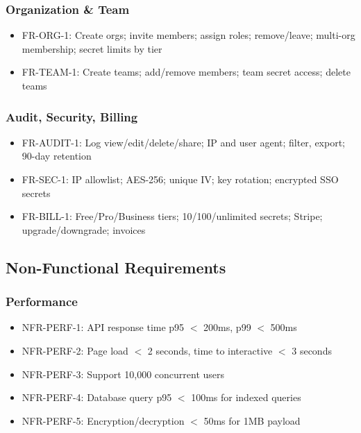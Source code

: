 \documentclass[12pt,a4paper]{article}
\begin{document}
\subsubsection*{Organization \& Team}
\begin{itemize}[leftmargin=*, itemsep=0.1em]
  \item FR-ORG-1: Create orgs; invite members; assign roles; remove/leave; multi-org membership; secret limits by tier
  \item FR-TEAM-1: Create teams; add/remove members; team secret access; delete teams
\end{itemize}

\subsubsection*{Audit, Security, Billing}
\begin{itemize}[leftmargin=*, itemsep=0.1em]
  \item FR-AUDIT-1: Log view/edit/delete/share; IP and user agent; filter, export; 90-day retention
  \item FR-SEC-1: IP allowlist; AES-256; unique IV; key rotation; encrypted SSO secrets
  \item FR-BILL-1: Free/Pro/Business tiers; 10/100/unlimited secrets; Stripe; upgrade/downgrade; invoices
\end{itemize}

\subsection*{\fontsize{14pt}{1.2} Non-Functional Requirements}

\subsubsection*{Performance}
\begin{itemize}[leftmargin=*, itemsep=0.1em]
  \item NFR-PERF-1: API response time p95 $<$ 200ms, p99 $<$ 500ms
  \item NFR-PERF-2: Page load $<$ 2 seconds, time to interactive $<$ 3 seconds
  \item NFR-PERF-3: Support 10,000 concurrent users
  \item NFR-PERF-4: Database query p95 $<$ 100ms for indexed queries
  \item NFR-PERF-5: Encryption/decryption $<$ 50ms for 1MB payload
\end{itemize}
\end{document}
